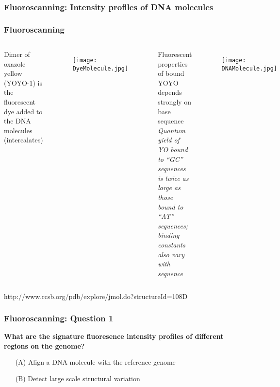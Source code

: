 \documentclass[10pt,dvipsnames,table, notes]{beamer} %
\begin{document}
\begin{frame}
\frametitle{Fluoroscanning: Intensity profiles of DNA molecules}
\begin{center}
\end{center}

\end{frame}

\begin{frame}
\frametitle{Fluoroscanning}
\begin{columns}
Dimer of oxazole yellow (YOYO-1) is the fluorescent dye added to the DNA molecules (intercalates) \\
\vspace{0.5cm}
\begin{figure}
\texttt{[image: DyeMolecule.jpg]}
\end{figure}


Fluorescent properties of bound YOYO depends strongly on base sequence \\
\vspace{0.5cm}
{\emph{Quantum yield of YO bound to “GC” sequences is twice as large as those bound to “AT” sequences; binding constants also vary with sequence}}
\begin{figure}
\texttt{[image: DNAMolecule.jpg]}
\end{figure}
\end{columns}
\vspace{0.5cm}
http://www.rcsb.org/pdb/explore/jmol.do?structureId=108D
\end{frame}

\begin{frame}
\frametitle{Fluoroscanning: Question 1}
{\bf{\Large{What are the signature fluoresence intensity profiles of different regions on the genome?}}}
\vspace{1cm}
\begin{enumerate}
\item[\textcolor{Apricot}{(A)}] \large{\textcolor{Apricot}{Align a DNA molecule with the reference genome}} 
\vspace{1cm}
\item[\textcolor{Apricot}{(B)}] \large{\textcolor{Apricot}{Detect large scale structural variation }}
\end{enumerate}
\end{frame}
\end{document}
